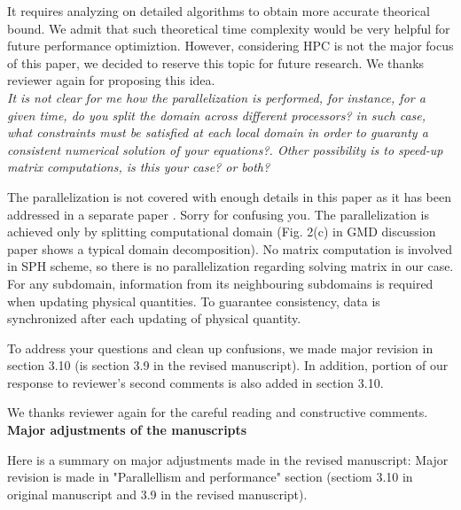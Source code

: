 \documentclass[10pt,a4paper]{article}
\begin{document}
It requires analyzing on detailed algorithms to obtain more accurate theorical bound. We admit that such theoretical time complexity would be very helpful for future performance optimiztion. However, considering HPC is not the major focus of this paper, we decided to reserve this topic for future research. We thanks reviewer again for proposing this idea.\\[3pt]

\textit{It is not clear for me how the parallelization is performed, for instance, for a given time, do you split the domain across different processors? in such case, what constraints must be satisfied at each local domain in order to guaranty a consistent numerical solution of your equations?. Other possibility is to speed-up matrix computations, is this your case? or both?}

The parallelization is not covered with enough details in this paper as it has been addressed in a separate paper \cite {cao2017data}. Sorry for confusing you. The parallelization is achieved only by splitting computational domain (Fig. 2(c) in GMD discussion paper shows a typical domain decomposition). No matrix computation is involved in SPH scheme, so there is no parallelization regarding solving matrix in our case.
For any subdomain, information from its neighbouring subdomains is required when updating physical quantities.   To guarantee consistency, data is synchronized after each updating of physical quantity.

To address your questions and clean up confusions, we made major revision in section 3.10 (is section 3.9 in the revised manuscript). In addition, portion of our response to reviewer's second comments is also added in section 3.10.
 
We thanks reviewer again for the careful reading and constructive comments.\\[12pt]

\textbf{\large Major adjustments of the manuscripts}

Here is a summary on major adjustments made in the revised manuscript: 
Major revision is made in "Parallellism and performance" section (sectiom 3.10 in original manuscript and 3.9 in the revised manuscript). 



\end{document}
